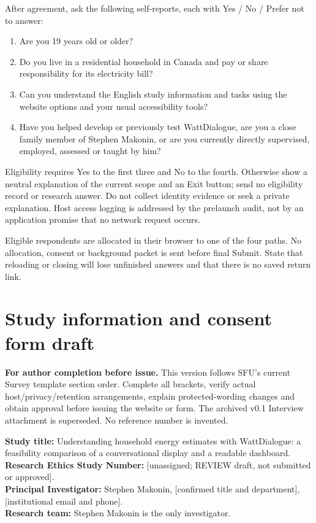 \documentclass[11pt,letterpaper]{article}
\begin{document}
After agreement, ask the following self-reports, each with Yes / No / Prefer not to answer:
\begin{enumerate}
\item Are you 19 years old or older?
\item Do you live in a residential household in Canada and pay or share responsibility for its electricity bill?
\item Can you understand the English study information and tasks using the website options and your usual accessibility tools?
\item Have you helped develop or previously test WattDialogue, are you a close family member of Stephen Makonin, or are you currently directly supervised, employed, assessed or taught by him?
\end{enumerate}
Eligibility requires Yes to the first three and No to the fourth. Otherwise show a neutral explanation of the current scope and an Exit button; send no eligibility record or research answer. Do not collect identity evidence or seek a private explanation. Host access logging is addressed by the prelaunch audit, not by an application promise that no network request occurs.

Eligible respondents are allocated in their browser to one of the four paths. No allocation, consent or background packet is sent before final Submit. State that reloading or closing will lose unfinished answers and that there is no saved return link.

\newpage
\section{Study information and consent form draft}\label{app:consent}
\textbf{For author completion before issue.} This version follows SFU's current Survey template section order. Complete all brackets, verify actual host/privacy/retention arrangements, explain protected-wording changes and obtain approval before issuing the website or form. The archived v0.1 Interview attachment is superseded. No reference number is invented.

\textbf{Study title:} Understanding household energy estimates with WattDialogue: a feasibility comparison of a conversational display and a readable dashboard.\\
\textbf{Research Ethics Study Number:} [unassigned; REVIEW draft, not submitted or approved].\\
\textbf{Principal Investigator:} Stephen Makonin, [confirmed title and department], [institutional email and phone].\\
\textbf{Research team:} Stephen Makonin is the only investigator.
\end{document}
